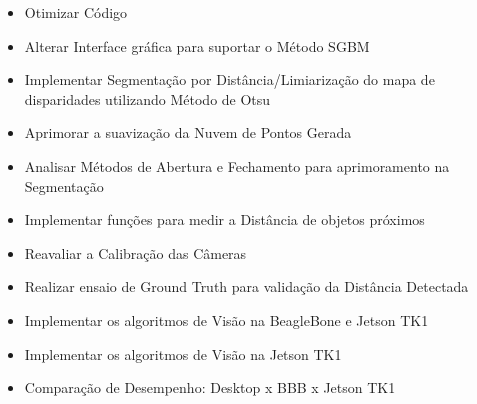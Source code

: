 \begin{itemize}
	\item Otimizar Código
	\item Alterar Interface gráfica para suportar o Método SGBM
	\item Implementar Segmentação por Distância/Limiarização do mapa de disparidades utilizando Método de Otsu
	\item Aprimorar a suavização da Nuvem de Pontos Gerada
	\item Analisar Métodos de Abertura e Fechamento para aprimoramento na Segmentação
	\item Implementar funções para medir a Distância de objetos próximos
	\item Reavaliar a Calibração das Câmeras	
	\item Realizar ensaio de Ground Truth para validação da Distância Detectada
	\item Implementar os algoritmos de Visão na BeagleBone e Jetson TK1
	\item Implementar os algoritmos de Visão na Jetson TK1
	\item Comparação de Desempenho: Desktop x BBB x Jetson TK1
\end{itemize}








